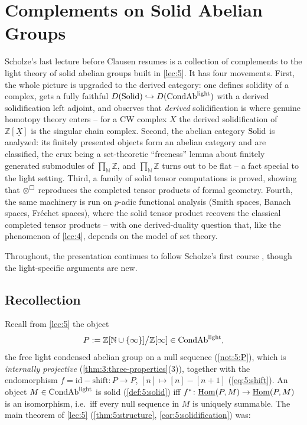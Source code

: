 \section{Complements on Solid Abelian Groups}
\label{lec:6}

Scholze's last lecture before Clausen resumes is a collection of complements to
the light theory of solid abelian groups built in \cref{lec:5}. It has four
movements. First, the whole picture is upgraded to the derived category: one
defines solidity of a complex, gets a fully faithful $D(\mathrm{Solid})\hookrightarrow
D(\mathrm{CondAb}^{\mathrm{light}})$ with a derived solidification left adjoint, and observes that
\emph{derived} solidification is where genuine homotopy theory enters -- for a
CW complex $X$ the derived solidification of $\mathbb{Z}[\underline{X}]$ is the
singular chain complex. Second, the abelian category $\mathrm{Solid}$ is analyzed: its
finitely presented objects form an abelian category and are classified, the
crux being a set-theoretic ``freeness'' lemma about finitely generated
submodules of $\prod_{\mathbb{N}}\mathbb{Z}$, and $\prod_{\mathbb{N}}\mathbb{Z}$
turns out to be flat -- a fact special to the light setting. Third, a family of
solid tensor computations is proved, showing that $\otimes^{\square}$ reproduces
the completed tensor products of formal geometry. Fourth, the same machinery is
run on $p$-adic functional analysis (Smith spaces, Banach spaces, Fréchet
spaces), where the solid tensor product recovers the classical completed tensor
products -- with one derived-duality question that, like the phenomenon of
\cref{lec:4}, depends on the model of set theory.

Throughout, the presentation continues to follow Scholze's first course
\cite{scholze2019condensed}, though the light-specific arguments are new.

\subsection{Recollection}

Recall from \cref{lec:5} the object
\begin{equation*}
P:=\mathbb{Z}[\mathbb{N}\cup\{\infty\}]\big/\mathbb{Z}[\infty]\in\mathrm{CondAb}^{\mathrm{light}},
\end{equation*}
the free light condensed abelian group on a null sequence
(\cref{not:5:P}), which is \emph{internally projective}
(\cref{thm:3:three-properties}(3)), together with the endomorphism
$f=\mathrm{id}-\mathrm{shift}\colon P\to P$, $[n]\mapsto[n]-[n+1]$
(\cref{eq:5:shift}). An object $M\in\mathrm{CondAb}^{\mathrm{light}}$ is solid
(\cref{def:5:solid}) iff $f^{\ast}\colon\underline{\operatorname{Hom}}(P,M)\to\underline{\operatorname{Hom}}(P,M)$ is an
isomorphism, i.e.\ iff every null sequence in $M$ is uniquely summable. The main
theorem of \cref{lec:5} (\cref{thm:5:structure}, \cref{cor:5:solidification})
was:


